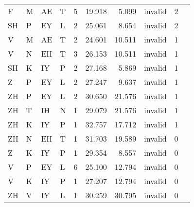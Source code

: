 \begin{longtable}{l@{ } l@{ } l@{ } l r r r r r r}
F  & M  & AE & T  & 5  & 19.918 & 5.099  & invalid & 2 \\
SH & P  & EY & L  & 2  & 25.061 & 8.654  & invalid & 2 \\
V  & M  & AE & T  & 2  & 24.601 & 10.511 & invalid & 1 \\
V  & N  & EH & T  & 3  & 26.153 & 10.511 & invalid & 1 \\
SH & K  & IY & P  & 2  & 27.168 & 5.869  & invalid & 1 \\
Z  & P  & EY & L  & 2  & 27.247 & 9.637  & invalid & 1 \\
ZH & P  & EY & L  & 2  & 30.650 & 21.576 & invalid & 1 \\
ZH & T  & IH & N  & 1  & 29.079 & 21.576 & invalid & 1 \\
ZH & K  & IY & P  & 1  & 32.757 & 17.712 & invalid & 1 \\
ZH & N  & EH & T  & 1  & 31.703 & 19.589 & invalid & 0 \\
Z  & K  & IY & P  & 1  & 29.354 & 8.557  & invalid & 0 \\
V  & P  & EY & L  & 6  & 25.100 & 12.794 & invalid & 0 \\
V  & K  & IY & P  & 1  & 27.207 & 12.794 & invalid & 0 \\
ZH & V  & IY & L  & 1  & 30.259 & 30.795 & invalid & 0 \\
\bottomrule
\end{longtable}
